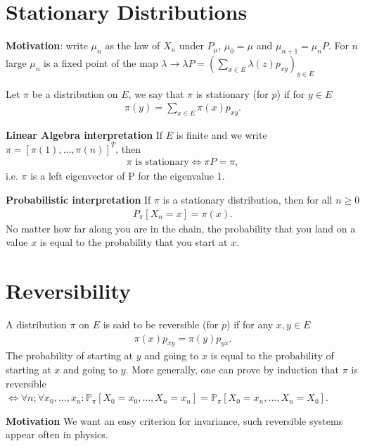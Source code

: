 \section{Stationary Distributions}
\textbf{Motivation}: write $\mu_{n}$ as the law of $X_{n}$ under $P_{\mu}$, $\mu_0=\mu$ and $\mu_{n+1}=\mu_{n}P$. For $n$ large $\mu_n$ is a fixed point of the map $\lambda \to \lambda P = \left( \sum_{x \in E} \lambda(z)p_{xy} \right)_{y \in E}$

\begin{defn}
	Let $\pi$ be a distribution on $E$, we say that $\pi$ is stationary (for $p$) if for $y \in E$
\begin{align}
	\boxed{ \pi(y) = \sum_{x \in E} \pi(x)p_{xy}.}
\end{align}

\textbf{Linear Algebra interpretation} If $E$ is finite and we write  $\pi = [\pi(1), \ldots ,\pi(n)]^T$, then 
\begin{align}
	\boxed{ \pi \textrm{ is stationary} \iff \pi P = \pi ,}
\end{align}
i.e. $\pi$ is a left eigenvector of P for the eigenvalue 1.

\textbf{Probabilistic interpretation} If $\pi $ is a stationary distribution, then for all $ n \geq 0$ 
\begin{align}
	P_{\pi }[X_n =x] = \pi (x)
.\end{align}
No matter how far along you are in the chain, the probability that you land on a value $x$ is equal to the probability that you start at $x$.
\end{defn}

\section{Reversibility}
\begin{defn}
	A distribution $\pi $ on $ E$ is said to be reversible (for $p$) if for any $x,y \in E$
\begin{align}
	\boxed{ \pi (x) p_{xy}= \pi (y)p_{yx}. }
\end{align}
The probability of starting at $y$ and going to $x$ is equal to the probability of starting at $x$ and going to $y$. More generally, one can prove by induction that $\pi $ is reversible $ \iff \forall n; \forall x_0, \ldots ,x_n: \mathbb{P}_{\pi } \left[ X_0=x_0, \ldots ,X_n=x_n \right] = \mathbb{P}_{\pi } \left[ X_0=x_n, \ldots ,X_n=X_0 \right] $.
\end{defn}

\textbf{Motivation} We want an easy criterion for invariance, such reversible systems appear often in physics.

